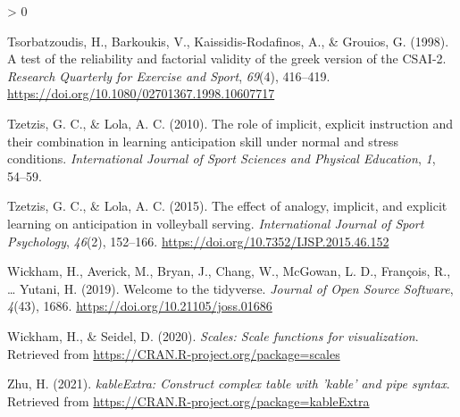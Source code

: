 \documentclass[
  english,
  man,floatsintext]{apa7}
\newlength{\cslhangindent}
\newenvironment{CSLReferences}[2] %
 {%
  \setlength{\parindent}{0pt}
  \ifodd #1 \everypar{\setlength{\hangindent}{\cslhangindent}}\ignorespaces\fi
  \ifnum #2 > 0
  \setlength{\parskip}{#2\baselineskip}
  \fi
 }%
 {}
\begin{document}
\begin{CSLReferences}{1}{0}
\leavevmode\hypertarget{ref-tsorbatzoudis1998}{}%
Tsorbatzoudis, H., Barkoukis, V., Kaissidis-Rodafinos, A., \& Grouios, G. (1998). A test of the reliability and factorial validity of the greek version of the CSAI-2. \emph{Research Quarterly for Exercise and Sport}, \emph{69}(4), 416--419. \url{https://doi.org/10.1080/02701367.1998.10607717}

\leavevmode\hypertarget{ref-tzetzis2010}{}%
Tzetzis, G. C., \& Lola, A. C. (2010). The role of implicit, explicit instruction and their combination in learning anticipation skill under normal and stress conditions. \emph{International Journal of Sport Sciences and Physical Education}, \emph{1}, 54--59.

\leavevmode\hypertarget{ref-tzetzis2015}{}%
Tzetzis, G. C., \& Lola, A. C. (2015). The effect of analogy, implicit, and explicit learning on anticipation in volleyball serving. \emph{International Journal of Sport Psychology}, \emph{46}(2), 152--166. \url{https://doi.org/10.7352/IJSP.2015.46.152}

\leavevmode\hypertarget{ref-R-tidyverse}{}%
Wickham, H., Averick, M., Bryan, J., Chang, W., McGowan, L. D., François, R., \ldots{} Yutani, H. (2019). Welcome to the {tidyverse}. \emph{Journal of Open Source Software}, \emph{4}(43), 1686. \url{https://doi.org/10.21105/joss.01686}

\leavevmode\hypertarget{ref-R-scales}{}%
Wickham, H., \& Seidel, D. (2020). \emph{Scales: Scale functions for visualization}. Retrieved from \url{https://CRAN.R-project.org/package=scales}

\leavevmode\hypertarget{ref-R-kableExtra}{}%
Zhu, H. (2021). \emph{kableExtra: Construct complex table with 'kable' and pipe syntax}. Retrieved from \url{https://CRAN.R-project.org/package=kableExtra}

\end{CSLReferences}
\end{document}
